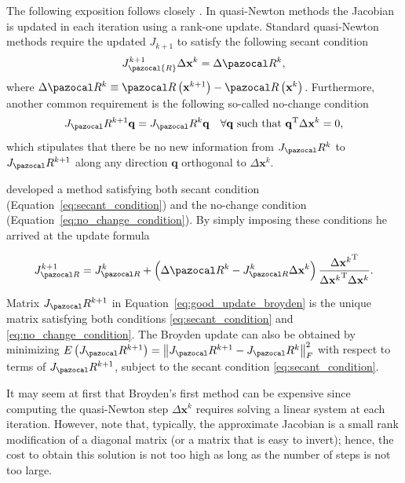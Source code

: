 The following exposition follows closely \cite{fang_two_2009}.
In quasi-Newton methods the Jacobian is updated in each iteration using a rank-one update.
Standard quasi-Newton methods require the updated \(J_{k+1}\) to satisfy the following secant condition
\begin{equation} \label{eq:secant_condition}
J_\pazocal{R}^{k+1} \Delta \mathbf x^{k}=\Delta \pazocal R^{k},
\end{equation}
where \(\Delta \pazocal R^{k}\equiv \pazocal R\left(\mathbf x^{k+1}\right)-\pazocal R\left(\mathbf x^ {k}\right)\).
Furthermore, another common requirement is the following so-called no-change condition
\begin{equation} \label{eq:no_change_condition}
J_\pazocal R^{k+1} \mathbf q=J_\pazocal R^{k} \mathbf q \quad \forall \mathbf q \text { such that } \mathbf q^{\mathrm{T}} \Delta \mathbf x^{k}=0,
\end{equation}
which stipulates that there be no new information from \(J_\pazocal R^{k}\) to \(J_\pazocal R^{k+1}\) along any direction \(\mathbf q\) orthogonal to \(\Delta \mathbf x^{k}\).

\cite{broyden_class_1965} developed a method satisfying both secant condition (Equation~\eqref{eq:secant_condition}) and the no-change condition (Equation~\eqref{eq:no_change_condition}).
By simply imposing these conditions he arrived at the update formula
\begin{highlight}
\begin{equation} \label{eq:good_update_broyden}
J_{\pazocal R}^{k+1}=J_{\pazocal R}^{k}+\left(\Delta \pazocal R^{k}-J_{\pazocal R}^{k} \Delta \mathbf x^{k}\right) \frac{\Delta {\mathbf x^{k}}^{\mathrm{T}}}{\Delta {\mathbf x^{k}}^{\mathrm{T}} \Delta \mathbf x^{k}}.
\end{equation}
\end{highlight}

Matrix \(J_\pazocal R^{k+1}\) in Equation~\eqref{eq:good_update_broyden} is the unique matrix satisfying both conditions \eqref{eq:secant_condition} and \eqref{eq:no_change_condition}.
The Broyden update can also be obtained by minimizing \(E\left(J_\pazocal R^{k+1}\right)=\left\|J_\pazocal R^{k+1}-J_\pazocal R^{k}\right\|_{F}^{2}\) with respect to terms of \(J_\pazocal R^{k+1}\), subject to the secant condition \eqref{eq:secant_condition}.

It may seem at first that Broyden's first method can be expensive since computing the quasi-Newton step \(\Delta \mathbf x^{k}\) requires solving a linear system at each iteration.
However, note that, typically, the approximate Jacobian is a small rank modification of a diagonal matrix (or a matrix that is easy to invert); hence, the cost to obtain this solution is not too high as long as the number of steps is not too large.

